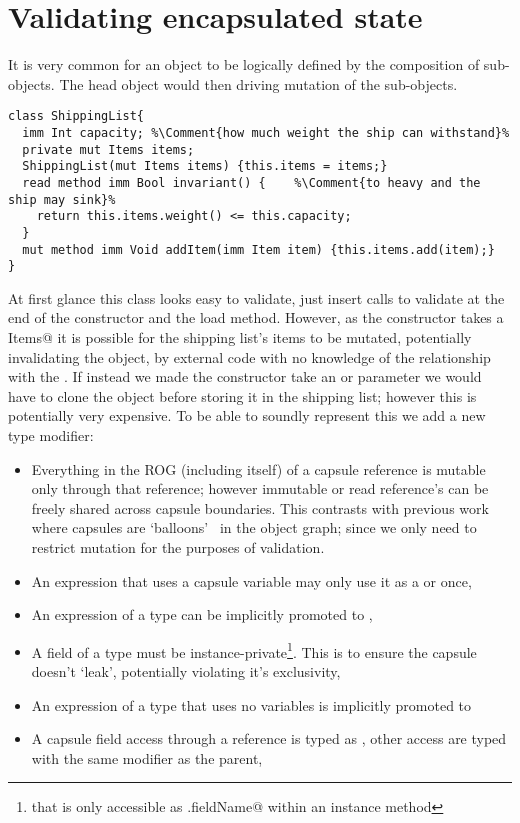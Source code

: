 \saveSpace
\section{Validating encapsulated state}
\label{s:encapsulated}
\saveSpace


It is very common for an object to be logically defined by the composition of sub-objects.
The head object would then driving mutation of the sub-objects.

\saveSpace
\begin{lstlisting}[escapechar=\%]
class ShippingList{
  imm Int capacity; %\Comment{how much weight the ship can withstand}%
  private mut Items items;
  ShippingList(mut Items items) {this.items = items;}
  read method imm Bool invariant() {	%\Comment{to heavy and the ship may sink}%
    return this.items.weight() <= this.capacity;
  }
  mut method imm Void addItem(imm Item item) {this.items.add(item);}
}
\end{lstlisting}
\saveSpace
At first glance this class looks easy to validate, just insert calls to validate at the end of the constructor and the load method. However, as the constructor takes a \Q@mut Items@ it is possible for the shipping list's items to be mutated, potentially invalidating the object, by external code with no knowledge of the relationship with the \Q@ShippingList@. If instead we made the constructor take an \Qimm@ or \Qread@ parameter we would have to clone the object before storing it in the shipping list; however this is potentially very expensive. To be able to soundly represent this we add a new \Q@capsule@ type modifier:
\begin{itemize}
\item Everything in the ROG (including itself) of a capsule reference is mutable only through that reference; however immutable or read reference's can be freely shared across capsule boundaries. This contrasts with previous work where capsules are `balloons'~\cite{Almeida97,ServettoEtAl13a} in the object graph; since we only need to restrict mutation for the purposes of validation.
\item An expression that uses a capsule variable may only use it as a \Q@capsule@ or \@mut@ once,
\item An expression of a \@capsule@ type can be implicitly promoted to \@mut@,
\item A field of a \Q@capsule@ type must be instance-private\footnote{that is only accessible as \Q@this.fieldName@ within an instance method}. This is to ensure the capsule doesn't `leak', potentially violating it's exclusivity,
\item An expression of a \Q@mut@ type that uses no \Q@mut@ variables is implicitly promoted to \Q@capsule@
\item A capsule field access through a \Q@capsule@ reference is typed as \Q@mut@, other access are typed with the same modifier as the parent,
\end{itemize}

